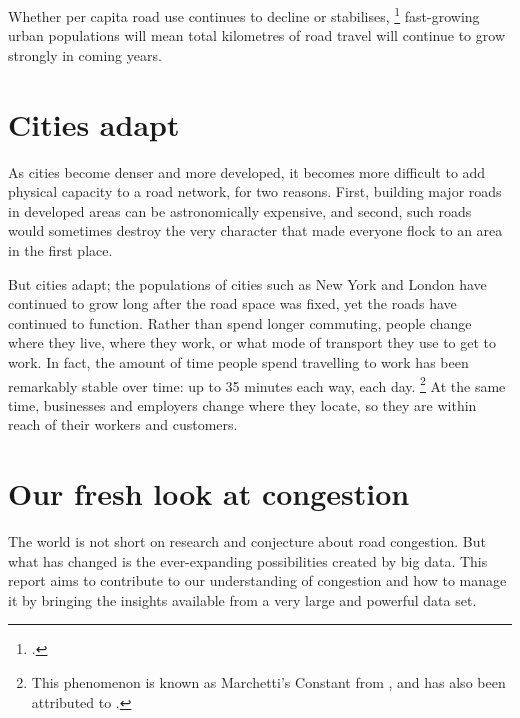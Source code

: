 \documentclass{grattan}
\begin{document}
Whether per capita road use continues to decline or stabilises,
\footcite[][9]{BITRE-2015-Traffic-and-congestion-cost-trends-for-Aust-capital-cities}
fast-growing urban populations will mean total kilometres of road travel will continue to grow strongly in coming years.

\section{Cities adapt}

As cities become denser and more developed, it becomes more difficult to add physical capacity to a road network, for two reasons.
First, building major roads in developed areas can be astronomically expensive, and second, such roads would sometimes destroy the very character that made everyone flock to an area in the first place.

But cities adapt; the populations of cities such as New York and London have continued to grow long after the road space was fixed, yet the roads have continued to function.
Rather than spend longer commuting, people change where they live, where they work, or what mode of transport they use to get to work. In fact, the amount of time people spend travelling to work has been remarkably stable over time: up to 35 minutes each way, each day.%
    \footnote{This phenomenon is known as Marchetti's Constant from \textcite{marchetti1994anthropological}, and has also been attributed to \textcites{Zahavi-1979-UMOT-Urban-interactions}{Zahavi-1981-UMOT-Urban-interactions}.}
At the same time, businesses and employers change where they locate, so they are within reach of their workers and customers.

\section{Our fresh look at congestion}\label{sec:Our-fresh-look}

The world is not short on research and conjecture about road congestion.
But what has changed is the ever-expanding possibilities created by big data.
This report aims to contribute to our understanding of congestion and how to manage it by bringing the insights available from a very large and powerful data set.
\end{document}
